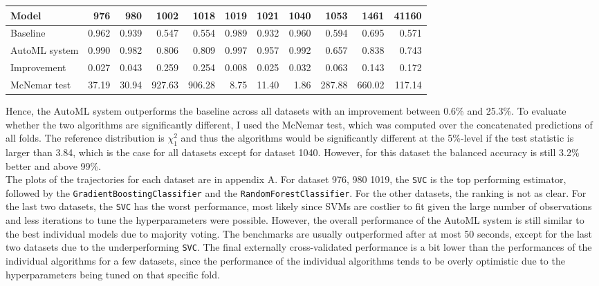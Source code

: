 \documentclass[11pt]{article}
\begin{document}
\vspace{-0.2cm}
\begin{table}[H]
\centering
\begin{tabular}{lrrrrrrrrrr}
\toprule
Model &   976 &   980 &  1002 &  1018 &  1019 &  1021 &  1040 &  1053 &  1461 &  41160 \\
\midrule
Baseline & 0.962 & 0.939 & 0.547 & 0.554 & 0.989 & 0.932 & 0.960 & 0.594 & 0.695 & 0.571 \\
AutoML system & 0.990 & 0.982 & 0.806 & 0.809 & 0.997 & 0.957 & 0.992 & 0.657 & 0.838 & 0.743 \\
\midrule
Improvement & 0.027 & 0.043 & 0.259 & 0.254 & 0.008 & 0.025 & 0.032 & 0.063 & 0.143 & 0.172 \\
McNemar test & 37.19 & 30.94 & 927.63 & 906.28 & 8.75 & 11.40 & 1.86 & 287.88 & 660.02 & 117.14 \\
\bottomrule
\end{tabular}
\end{table}
\vspace{-0.2cm}

Hence, the AutoML system outperforms the baseline across all datasets with an improvement between 0.6\% and 25.3\%. To evaluate whether the two algorithms are significantly different, I used the McNemar test, which was computed over the concatenated predictions of all folds. The reference distribution is $\chi_{1}^{2}$ and thus the algorithms would be significantly different at the 5\%-level if the test statistic is larger than 3.84, which is the case for all datasets except for dataset 1040. However, for this dataset the balanced accuracy is still 3.2\% better and above 99\%. \\

The plots of the trajectories for each dataset are in appendix A. For dataset 976, 980 1019, the \texttt{SVC} is the top performing estimator, followed by the \texttt{GradientBoostingClassifier} and the \texttt{RandomForestClassifier}. For the other datasets, the ranking is not as clear. For the last two datasets, the \texttt{SVC} has the worst performance, most likely since SVMs are costlier to fit given the large number of observations and less iterations to tune the hyperparameters were possible. However, the overall performance of the AutoML system is still similar to the best individual models due to majority voting. The benchmarks are usually outperformed after at most 50 seconds, except for the last two datasets due to the underperforming \texttt{SVC}. The final externally cross-validated performance is a bit lower than the performances of the individual algorithms for a few datasets, since the performance of the individual algorithms tends to be overly optimistic due to the hyperparameters being tuned on that specific fold. \\
\end{document}
